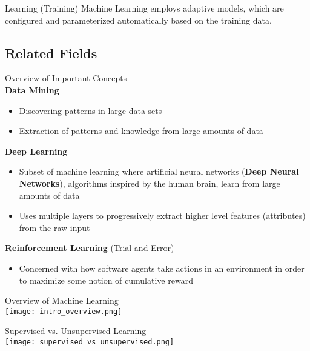 \begin{definition}{Learning (Training)}
Machine Learning employs adaptive models, which are configured and parameterized automatically based on the training data.
\end{definition}

\subsection{Related Fields}

\begin{theorem}{Overview of Important Concepts}\\
    \textcolor{frog}{\textbf{Data Mining}}
    \begin{itemize}
        \item Discovering patterns in large data sets
        \item Extraction of patterns and knowledge from large amounts of data
    \end{itemize}
    \textcolor{frog}{\textbf{Deep Learning}}
    \begin{itemize}
        \item Subset of machine learning where artificial neural networks (\textcolor{frog}{\textbf{Deep Neural Networks}}), algorithms inspired by the human brain, learn from large amounts of data
        \item Uses multiple layers to progressively extract higher level features (attributes) from the raw input
    \end{itemize}
    \textcolor{frog}{\textbf{Reinforcement Learning}} (Trial and Error)
    \begin{itemize}
        \item Concerned with how software agents take actions in an environment in order to maximize some notion of cumulative reward
    \end{itemize}
\end{theorem}



\raggedcolumns

\multend


\begin{concept}{Overview of Machine Learning}\\
    \texttt{[image: intro\_overview.png]}
\end{concept}

\begin{concept}{Supervised vs. Unsupervised Learning}\\
    \texttt{[image: supervised\_vs\_unsupervised.png]}
\end{concept}

